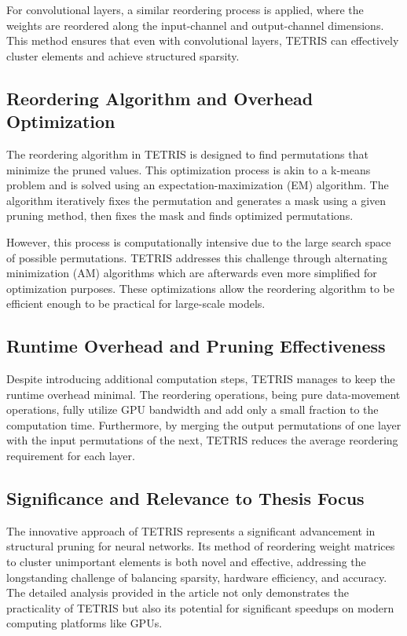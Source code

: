 For convolutional layers, a similar reordering process is applied, where the weights are reordered along the input-channel and output-channel dimensions. This method ensures that even with convolutional layers, TETRIS can effectively cluster elements and achieve structured sparsity.

\subsection{Reordering Algorithm and Overhead Optimization}
\label{reordering}

The reordering algorithm in TETRIS is designed to find permutations that minimize the pruned values. This optimization process is akin to a k-means problem and is solved using an expectation-maximization (EM) algorithm. The algorithm iteratively fixes the permutation and generates a mask using a given pruning method, then fixes the mask and finds optimized permutations.

However, this process is computationally intensive due to the large search space of possible permutations. TETRIS addresses this challenge through alternating minimization (AM) algorithms which are afterwards even more simplified for optimization purposes. These optimizations allow the reordering algorithm to be efficient enough to be practical for large-scale models.

\subsection{Runtime Overhead and Pruning Effectiveness}

Despite introducing additional computation steps, TETRIS manages to keep the runtime overhead minimal. The reordering operations, being pure data-movement operations, fully utilize GPU bandwidth and add only a small fraction to the computation time. Furthermore, by merging the output permutations of one layer with the input permutations of the next, TETRIS reduces the average reordering requirement for each layer.

\subsection{Significance and Relevance to Thesis Focus}

The innovative approach of TETRIS represents a significant advancement in structural pruning for neural networks. Its method of reordering weight matrices to cluster unimportant elements is both novel and effective, addressing the longstanding challenge of balancing sparsity, hardware efficiency, and accuracy. The detailed analysis provided in the article not only demonstrates the practicality of TETRIS but also its potential for significant speedups on modern computing platforms like GPUs.

